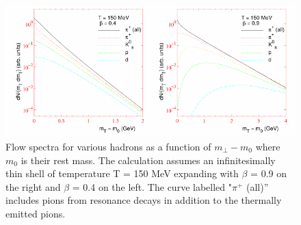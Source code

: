 \documentclass[12pt,a4paper]{book}
\begin{document}
	
	\begin{figure}[ht]
		\centering
		\includegraphics[width=0.8\linewidth]{pictures/flow_spectra.png}
		\caption{Flow spectra for various hadrons as a function of $m_\perp-m_0$ where $m_0$ is their rest mass. The calculation assumes an infinitesimally thin shell of temperature T = 150 MeV expanding with $\beta$ = 0.9 on the right and $\beta$ = 0.4 on the left. The curve labelled "$\pi^+$ (all)” includes pions from resonance decays in addition to the thermally emitted pions.}
		\label{fig:flow_spectra} 
	\end{figure}
	\FloatBarrier
\end{document}
